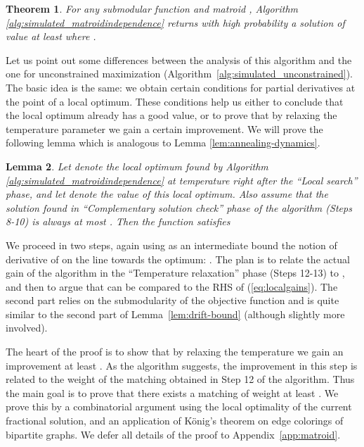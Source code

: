 \documentclass{article}[11pt]
\newtheorem{theorem}{Theorem}[section]
\newtheorem{lemma}[theorem]{Lemma}
\begin{document}
\begin{theorem}
\label{thm:0.325-approx}
For any submodular function  and matroid ,
Algorithm \ref{alg:simulated_matroidindependence} returns with high probability
a solution of value at least  where .
\end{theorem}

Let us point out some differences between the analysis of this algorithm
and the one for unconstrained maximization (Algorithm~\ref{alg:simulated_unconstrained}).
The basic idea is the same: we obtain certain conditions for partial derivatives
at the point of a local optimum. These conditions help us either to conclude
that the local optimum already has a good value, or to prove that by relaxing
the temperature parameter we gain a certain improvement. 
We will prove the following lemma which is analogous to Lemma \ref{lem:annealing-dynamics}.

\begin{lemma}
\label{lem:diffeq}
Let  denote the local optimum found by Algorithm \ref{alg:simulated_matroidindependence}
at temperature  right after the ``Local search'' phase,
and let  denote the value of this local optimum.
Also assume that the solution found in ``Complementary solution check'' phase
of the algorithm (Steps 8-10) is always at most .
Then the function  satisfies

\end{lemma}

We proceed in two steps, again using as an intermediate bound
the notion of derivative of  on the line towards the optimum:
.
The plan is to relate the actual gain of the algorithm in the ``Temperature relaxation''
 phase (Steps 12-13) to , and then to argue that  can be compared
to the RHS of (\ref{eq:localgains}).
The second part relies on the submodularity of the objective function and is quite similar
to the second part of Lemma~\ref{lem:drift-bound} (although slightly more involved).

The heart of the proof is to show that by relaxing the temperature
we gain an improvement at least . As the algorithm suggests,
the improvement in this step is related to the weight of the matching obtained in Step 12
of the algorithm. Thus the main goal is to prove that there exists a matching of weight
at least . We prove this by a combinatorial argument using
the local optimality of the current fractional solution, and 
an application of K\"{o}nig's theorem on edge colorings of bipartite graphs.
We defer all details of the proof to Appendix~\ref{app:matroid}.
\end{document}
